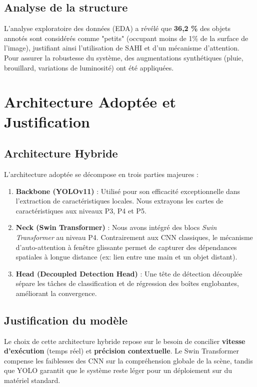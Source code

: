 \documentclass[a4paper,12pt]{article}
\begin{document}
\subsection{Analyse de la structure}
L'analyse exploratoire des données (EDA) a révélé que \textbf{36,2 \%} des objets annotés sont considérés comme "petits" (occupant moins de 1\% de la surface de l'image), justifiant ainsi l'utilisation de SAHI et d'un mécanisme d'attention. Pour assurer la robustesse du système, des augmentations synthétiques (pluie, brouillard, variations de luminosité) ont été appliquées.

\section{Architecture Adoptée et Justification}
\subsection{Architecture Hybride}
L'architecture adoptée se décompose en trois parties majeures :
\begin{enumerate}
    \item \textbf{Backbone (YOLOv11)} : Utilisé pour son efficacité exceptionnelle dans l'extraction de caractéristiques locales. Nous extrayons les cartes de caractéristiques aux niveaux P3, P4 et P5.
    \item \textbf{Neck (Swin Transformer)} : Nous avons intégré des blocs \textit{Swin Transformer} au niveau P4. Contrairement aux CNN classiques, le mécanisme d'auto-attention à fenêtre glissante permet de capturer des dépendances spatiales à longue distance (ex: lien entre une main et un objet distant).
    \item \textbf{Head (Decoupled Detection Head)} : Une tête de détection découplée sépare les tâches de classification et de régression des boîtes englobantes, améliorant la convergence.
\end{enumerate}

\subsection{Justification du modèle}
Le choix de cette architecture hybride repose sur le besoin de concilier \textbf{vitesse d'exécution} (temps réel) et \textbf{précision contextuelle}. Le Swin Transformer compense les faiblesses des CNN sur la compréhension globale de la scène, tandis que YOLO garantit que le système reste léger pour un déploiement sur du matériel standard.
\end{document}
